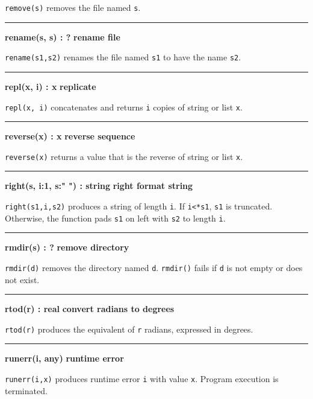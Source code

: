 \noindent
{}\texttt{remove(s)} removes the
file named \texttt{s}.

\bigskip\hrule\vspace{0.1cm}
\noindent
{\bf rename(s, s) : ? } \hfill {\bf rename file}

\noindent
{}\texttt{rename(s1,s2)} renames the file named
\texttt{s1} to have the name \texttt{s2}.

\bigskip\hrule\vspace{0.1cm}
\noindent
{\bf repl(x, i) : x } \hfill {\bf replicate}

\noindent
{}\texttt{repl(x, i)} concatenates and returns
\texttt{i} copies of string or list \texttt{x}.

\bigskip\hrule\vspace{0.1cm}
\noindent
{\bf reverse(x) : x } \hfill {\bf reverse sequence}

\noindent
{}\texttt{reverse(x)} returns a value that is the
reverse of string or list \texttt{x}.

\bigskip\hrule\vspace{0.1cm}
\noindent
{\bf right(s, i:1, s:" ") : string } \hfill {\bf right format string}

\noindent
{}\texttt{right(s1,i,s2)} produces a string of length
\texttt{i}. If \texttt{i{\textless}*s1}, \texttt{s1} is truncated.
Otherwise, the function pads \texttt{s1} on left with \texttt{s2} to
length \texttt{i}.

\bigskip\hrule\vspace{0.1cm}
\noindent
{\bf rmdir(s) : ? } \hfill {\bf remove directory}

\noindent
{}\texttt{rmdir(d)} removes the directory named
\texttt{d}. \texttt{rmdir()} fails if \texttt{d} is not empty or does
not exist.

\bigskip\hrule\vspace{0.1cm}
\noindent
{\bf rtod(r) : real } \hfill {\bf convert radians to degrees}

\noindent
{}\texttt{rtod(r)} produces the
equivalent of \texttt{r} radians, expressed in degrees.

\bigskip\hrule\vspace{0.1cm}
\noindent
{\bf runerr(i, any) } \hfill {\bf runtime error}

\noindent
{}\texttt{runerr(i,x)} produces runtime error
\texttt{i} with value \texttt{x}. Program execution is terminated.

